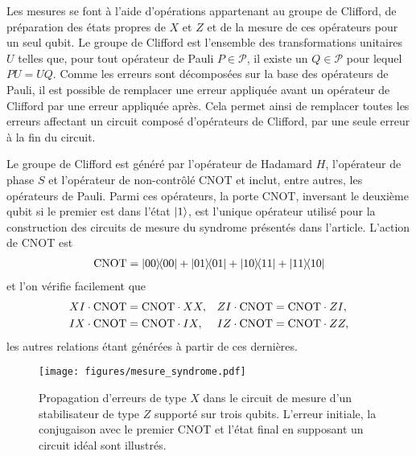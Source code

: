 Les mesures se font à l'aide d'opérations appartenant au groupe de Clifford,
de préparation des états propres de $X$ et $Z$ et de la mesure de ces opérateurs
pour un seul qubit.
Le groupe de Clifford est l'ensemble des transformations unitaires $U$ telles que,
pour tout opérateur de Pauli $P \in \mathcal P$,
il existe un $Q \in \mathcal P$ pour lequel $PU = UQ$.
Comme les erreurs sont décomposées sur la base des opérateurs de Pauli,
il est possible de remplacer une erreur appliquée avant un opérateur de Clifford
par une erreur appliquée après.
Cela permet ainsi de remplacer toutes les erreurs affectant un circuit composé d'opérateurs de Clifford,
par une seule erreur à la fin du circuit.

Le groupe de Clifford est généré par l'opérateur de Hadamard $H$,
l'opérateur de phase $S$ et l'opérateur de non-contrôlé $\text{CNOT}$
et inclut, entre autres, les opérateurs de Pauli.
Parmi ces opérateurs,
la porte $\text{CNOT}$,
inversant le deuxième qubit si le premier est dans l'état $\ket{1}$,
est l'unique opérateur utilisé pour la construction des circuits de mesure du syndrome 
présentés dans l'article.
L'action de CNOT est 
\begin{align}
	\text{CNOT} = \op{00}{00} + \op{01}{01} + \op{10}{11} + \op{11}{10}
\end{align}
et l'on vérifie facilement que
\begin{align}
	&XI \cdot \text{CNOT} = \text{CNOT} \cdot XX,
	&&ZI \cdot \text{CNOT} = \text{CNOT} \cdot ZI, \notag \\
	&IX \cdot \text{CNOT} = \text{CNOT} \cdot IX,
	&&IZ \cdot \text{CNOT} = \text{CNOT} \cdot ZZ,
	\label{eq:cnot_pauli}
\end{align}
les autres relations étant générées à partir de ces dernières.

\begin{figure}
	\centering
	\texttt{[image: figures/mesure\_syndrome.pdf]}
	\caption[Exemple de mesure de syndrome]{
		Propagation d'erreurs de type $X$ dans le circuit de mesure d'un
		stabilisateur de type $Z$ supporté sur trois qubits.
		L'erreur initiale, la conjugaison avec le premier CNOT 
		et l'état final en supposant un circuit idéal sont illustrés.
	}
	\label{fig:mesure_syndrome}
\end{figure}

